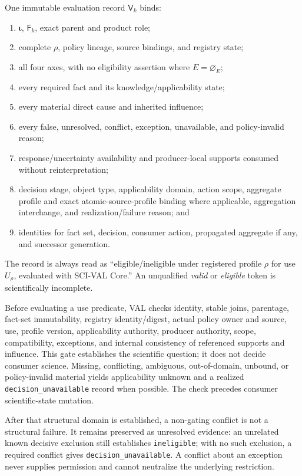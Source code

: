 One immutable evaluation record $\mathsf V_k$ binds:
\begin{enumerate}
  \item $\boldsymbol\iota$, $\mathsf F_k$, exact parent and product role;
  \item complete $\rho$, policy lineage, source bindings, and registry state;
  \item all four axes, with no eligibility assertion where
        $E=\varnothing_E$;
  \item every required fact and its knowledge/applicability state;
  \item every material direct cause and inherited influence;
  \item every false, unresolved, conflict, exception, unavailable, and
        policy-invalid reason;
  \item response/uncertainty availability and producer-local supports
        consumed without reinterpretation;
  \item decision stage, object type, applicability domain, action scope,
        aggregate profile and exact atomic-source-profile binding where
        applicable, aggregation interchange, and realization/failure reason;
        and
  \item identities for fact set, decision, consumer action, propagated
        aggregate if any, and successor generation.
\end{enumerate}
The record is always read as ``eligible/ineligible under registered profile
$\rho$ for use $U_\rho$, evaluated with SCI-VAL Core.'' An unqualified
\emph{valid} or \emph{eligible} token is scientifically incomplete.

Before evaluating a use predicate, VAL checks identity, stable joins,
parentage, fact-set immutability, registry identity/digest, actual policy owner
and source, use, profile version, applicability authority, producer authority,
scope, compatibility, exceptions, and internal consistency of referenced
supports and influence. This gate establishes the scientific question; it
does not decide consumer science. Missing, conflicting, ambiguous,
out-of-domain, unbound, or policy-invalid material yields applicability
unknown and a realized \texttt{decision\_unavailable} record when possible.
The check precedes consumer scientific-state mutation.

After that structural domain is established, a non-gating conflict is not a
structural failure. It remains preserved as unresolved evidence: an unrelated
known decisive exclusion still establishes \texttt{ineligible}; with no such
exclusion, a required conflict gives \texttt{decision\_unavailable}. A
conflict about an exception never supplies permission and cannot neutralize
the underlying restriction.

